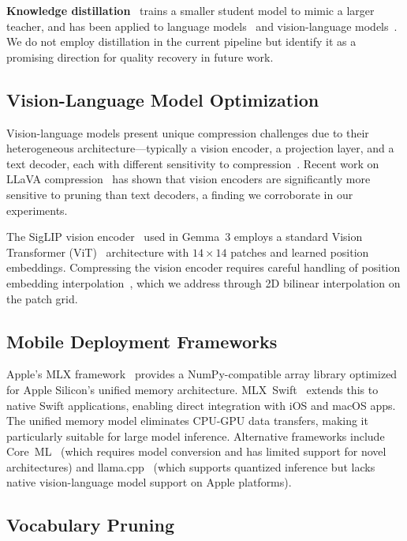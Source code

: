 \documentclass[11pt]{article}
\begin{document}
\textbf{Knowledge distillation}~\citep{hinton2015distilling} trains a smaller student model to mimic a larger teacher, and has been applied to language models~\citep{distilbert} and vision-language models~\citep{vldistill}. We do not employ distillation in the current pipeline but identify it as a promising direction for quality recovery in future work.

\subsection{Vision-Language Model Optimization}

Vision-language models present unique compression challenges due to their heterogeneous architecture---typically a vision encoder, a projection layer, and a text decoder, each with different sensitivity to compression~\citep{llava,flamingo}. Recent work on LLaVA compression~\citep{llavacompression} has shown that vision encoders are significantly more sensitive to pruning than text decoders, a finding we corroborate in our experiments.

The SigLIP vision encoder~\citep{siglip} used in Gemma~3 employs a standard Vision Transformer (ViT)~\citep{vit} architecture with $14\times14$ patches and learned position embeddings. Compressing the vision encoder requires careful handling of position embedding interpolation~\citep{flexivit}, which we address through 2D bilinear interpolation on the patch grid.

\subsection{Mobile Deployment Frameworks}

Apple's MLX framework~\citep{mlx} provides a NumPy-compatible array library optimized for Apple Silicon's unified memory architecture. MLX~Swift~\citep{mlxswift} extends this to native Swift applications, enabling direct integration with iOS and macOS apps. The unified memory model eliminates CPU-GPU data transfers, making it particularly suitable for large model inference. Alternative frameworks include Core~ML~\citep{coreml} (which requires model conversion and has limited support for novel architectures) and llama.cpp~\citep{llamacpp} (which supports quantized inference but lacks native vision-language model support on Apple platforms).

\subsection{Vocabulary Pruning}
\end{document}
